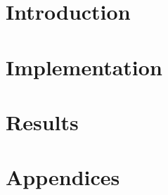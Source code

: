 \documentclass[abstract=on]{scrreprt}
\begin{document}



\tableofcontents

\part{Introduction}



\part{Implementation}


\part{Results}


\part{Appendices}



\end{document}

